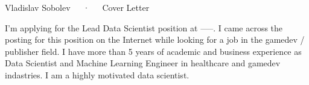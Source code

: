 \documentclass[11pt, a4paper]{awesome-cv}
\begin{document}
\makecvheader[R]

\makecvfooter
  {}
  {Vladislav Sobolev~~~·~~~Cover Letter}
  {}

\makelettertitle

\begin{cvletter}



I'm applying for the Lead Data Scientist position at -----. I came across the posting for this position on the Internet while looking for a job in the gamedev / publisher field. I have more than 5 years of academic and business experience as Data Scientist and Machine Learning Engineer in healthcare and gamedev indastries. I am a highly motivated data scientist.


\bigskip
\begin{cvitems}
  

\end{cvitems}
\end{cvletter}
\end{document}
